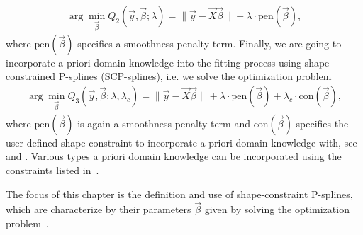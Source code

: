 \begin{align} \label{eq:OF-P-splines}
	\arg \min_{\vec{\beta}} Q_2(\vec{y}, \vec{\beta}; \lambda) = \lVert \vec{y} - \vec{X} \vec{\beta} \rVert + \lambda \cdot \text{pen}(\vec{\beta}),
\end{align}
%
where $\text{pen}(\vec{\beta})$ specifies a smoothness penalty term. Finally, we are going to incorporate a priori domain knowledge into the fitting process using shape-constrained P-splines (SCP-splines), i.e. we solve the optimization problem
\begin{align} \label{eq:OF-SCP-splines}
	\arg \min_{\vec{\beta}} Q_3(\vec{y}, \vec{\beta}; \lambda, \lambda_c) = \lVert \vec{y} - \vec{X} \vec{\beta} \rVert + \lambda \cdot \text{pen}(\vec{\beta}) + \lambda_c \cdot \text{con}(\vec{\beta}),
\end{align}
%
where $\text{pen}(\vec{\beta})$ is again a smoothness penalty term and $\text{con}({\vec{\beta}})$ specifies the user-defined shape-constraint to incorporate a priori domain knowledge with, see \cite{hofner2011monotonicity} and \cite{bollaerts2006simple}. Various types a priori domain knowledge can be incorporated using the constraints listed in~.



The focus of this chapter is the definition and use of shape-constraint P-splines, which are characterize by their parameters $\vec{\beta}$ given by solving the optimization problem~.

